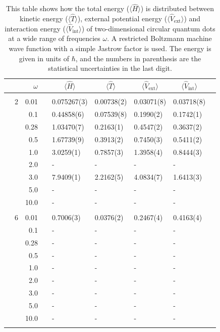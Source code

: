 \begin{table}
	\caption{This table shows how the total energy ($\langle\hat{H}\rangle$) is distributed between kinetic energy ($\langle\hat{T}\rangle$), external potential energy ($\langle\hat{V}_{\text{ext}}\rangle$) and interaction energy ($\langle\hat{V}_{\text{int}}\rangle$) of two-dimensional circular quantum dots at a wide range of frequencies $\omega$. A restricted Boltzmann machine wave function with a simple Jastrow factor is used. The energy is given in units of $\hbar$, and the numbers in parenthesis are the statistical uncertainties in the last digit.}
	\label{tab:splitfrequencyQDRBMSJ}
	\begin{tabularx}{\textwidth}{R{1cm}rrcR{2.3cm}R{2.3cm}R{2.3cm}R{2.3cm}R{1cm}} \hline\hline
		&\makecell{\\ \phantom{$N$} \\ \phantom{=}} & $\omega$ &&  &  &  &  & \\ \hline \\
		&2 & 0.01 && 0.075267(3) & 0.00738(2) & 0.03071(8) & 0.03718(8) \\
		&& 0.1 && 0.44858(6) & 0.07539(8) & 0.1990(2) & 0.1742(1) \\
		&& 0.28 && 1.03470(7) & 0.2163(1) & 0.4547(2) & 0.3637(2) \\
		&& 0.5 && 1.67739(9) & 0.3913(2) & 0.7450(3) & 0.5411(2)\\
		&& 1.0 && 3.0259(1) & 0.7857(3) & 1.3958(4) & 0.8444(3)\\
		&& 2.0 && - & - & - & -\\
		&& 3.0 && 7.9409(1) & 2.2162(5) & 4.0834(7) & 1.6413(3) \\ 
		&& 5.0 && - & - & - & -\\
		&& 10.0 && - & - & - & -\\
		\hdashline \\
		
		&6 & 0.01 && 0.7006(3) & 0.0376(2) & 0.2467(4) & 0.4163(4) \\
		&& 0.1 && - & - & - & - \\
		&& 0.28 && - & - & - & - \\
		&& 0.5 && - & - & - & - \\
		&& 1.0 && - & - & - & - \\
		&& 2.0 && - & - & - & -\\
		&& 3.0 && - & - & - & - \\ 
		&& 5.0 && - & - & - & -\\
		&& 10.0 && - & - & - & -\\
		\hdashline \\
		

\end{tabularx}
\end{table}
